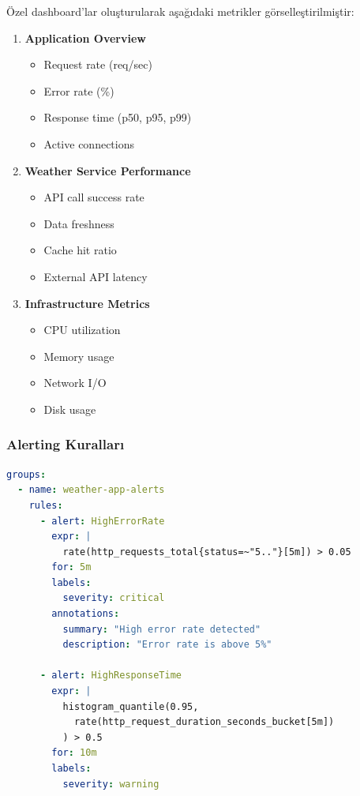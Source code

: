 \documentclass[12pt,a4paper]{article}
\begin{document}
Özel dashboard'lar oluşturularak aşağıdaki metrikler görselleştirilmiştir:

\begin{enumerate}
    \item \textbf{Application Overview}
    \begin{itemize}
        \item Request rate (req/sec)
        \item Error rate (\%)
        \item Response time (p50, p95, p99)
        \item Active connections
    \end{itemize}
    
    \item \textbf{Weather Service Performance}
    \begin{itemize}
        \item API call success rate
        \item Data freshness
        \item Cache hit ratio
        \item External API latency
    \end{itemize}
    
    \item \textbf{Infrastructure Metrics}
    \begin{itemize}
        \item CPU utilization
        \item Memory usage
        \item Network I/O
        \item Disk usage
    \end{itemize}
\end{enumerate}

\subsubsection{Alerting Kuralları}

\begin{lstlisting}[language=yaml, caption=Prometheus Alert Kuralları]
groups:
  - name: weather-app-alerts
    rules:
      - alert: HighErrorRate
        expr: |
          rate(http_requests_total{status=~"5.."}[5m]) > 0.05
        for: 5m
        labels:
          severity: critical
        annotations:
          summary: "High error rate detected"
          description: "Error rate is above 5%"
      
      - alert: HighResponseTime
        expr: |
          histogram_quantile(0.95, 
            rate(http_request_duration_seconds_bucket[5m])
          ) > 0.5
        for: 10m
        labels:
          severity: warning
\end{lstlisting}
\end{document}
